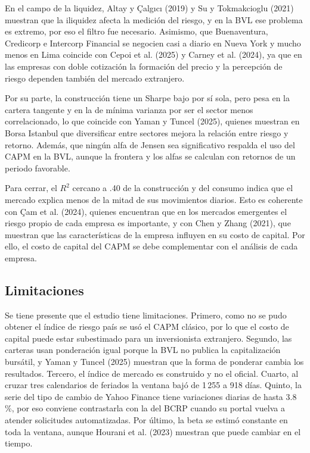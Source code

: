 \documentclass[12pt]{article}
\begin{document}
En el campo de la liquidez, Altay y Çalgıcı (2019) y Su y Tokmakcioglu (2021) muestran que la iliquidez afecta la medición del riesgo, y en la BVL ese problema es extremo, por eso el filtro fue necesario. Asimismo, que Buenaventura, Credicorp e Intercorp Financial se negocien casi a diario en Nueva York y mucho menos en Lima coincide con Cepoi et al. (2025) y Carney et al. (2024), ya que en las empresas con doble cotización la formación del precio y la percepción de riesgo dependen también del mercado extranjero.

Por su parte, la construcción tiene un Sharpe bajo por sí sola, pero pesa en la cartera tangente y en la de mínima varianza por ser el sector menos correlacionado, lo que coincide con Yaman y Tuncel (2025), quienes muestran en Borsa Istanbul que diversificar entre sectores mejora la relación entre riesgo y retorno. Además, que ningún alfa de Jensen sea significativo respalda el uso del CAPM en la BVL, aunque la frontera y los alfas se calculan con retornos de un periodo favorable.

Para cerrar, el $R^2$ cercano a .40 de la construcción y del consumo indica que el mercado explica menos de la mitad de sus movimientos diarios. Esto es coherente con Çam et al. (2024), quienes encuentran que en los mercados emergentes el riesgo propio de cada empresa es importante, y con Chen y Zhang (2021), que muestran que las características de la empresa influyen en su costo de capital. Por ello, el costo de capital del CAPM se debe complementar con el análisis de cada empresa.

\subsection{Limitaciones}
Se tiene presente que el estudio tiene limitaciones. Primero, como no se pudo obtener el índice de riesgo país se usó el CAPM clásico, por lo que el costo de capital puede estar subestimado para un inversionista extranjero. Segundo, las carteras usan ponderación igual porque la BVL no publica la capitalización bursátil, y Yaman y Tuncel (2025) muestran que la forma de ponderar cambia los resultados. Tercero, el índice de mercado es construido y no el oficial. Cuarto, al cruzar tres calendarios de feriados la ventana bajó de 1\,255 a 918 días. Quinto, la serie del tipo de cambio de Yahoo Finance tiene variaciones diarias de hasta 3.8\,\%, por eso conviene contrastarla con la del BCRP cuando su portal vuelva a atender solicitudes automatizadas. Por último, la beta se estimó constante en toda la ventana, aunque Hourani et al. (2023) muestran que puede cambiar en el tiempo.
\end{document}
